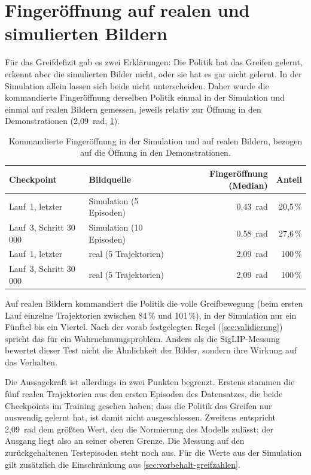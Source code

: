 \section{Fingeröffnung auf realen und simulierten Bildern}
\label{sec:span-gate}

Für das Greifdefizit gab es zwei Erklärungen: Die Politik hat das Greifen
gelernt, erkennt aber die simulierten Bilder nicht, oder sie hat es gar nicht
gelernt. In der Simulation allein lassen sich beide nicht unterscheiden. Daher
wurde die kommandierte Fingeröffnung derselben Politik einmal in der
Simulation und einmal auf realen Bildern gemessen, jeweils relativ zur
Öffnung in den Demonstrationen (2,09~rad, \cref{tab:span-gate}).

\begin{table}[htb]
  \centering
  \begin{tabular}{llrr}
    \toprule
    Checkpoint & Bildquelle & Fingeröffnung (Median) & Anteil \\
    \midrule
    Lauf~1, letzter   & Simulation (5 Episoden)     & 0,43~rad  & 20,5\,\% \\
    Lauf~3, Schritt 30\,000 & Simulation (10 Episoden) & 0,58~rad & 27,6\,\% \\
    Lauf~1, letzter   & real (5 Trajektorien)       & 2,09~rad  & 100\,\% \\
    Lauf~3, Schritt 30\,000 & real (5 Trajektorien) & 2,09~rad  & 100\,\% \\
    \bottomrule
  \end{tabular}
  \caption{Kommandierte Fingeröffnung in der Simulation und auf realen Bildern,
    bezogen auf die Öffnung in den Demonstrationen.}
  \label{tab:span-gate}
\end{table}

Auf realen Bildern kommandiert die Politik die volle Greifbewegung (beim ersten Lauf einzelne
Trajektorien zwischen 84\,\% und 101\,\%), in der Simulation nur ein Fünftel
bis ein Viertel. Nach der vorab festgelegten Regel (\cref{sec:validierung})
spricht das für ein Wahrnehmungsproblem. Anders als die SigLIP-Messung
bewertet dieser Test nicht die Ähnlichkeit der Bilder, sondern ihre Wirkung
auf das Verhalten.

Die Aussagekraft ist allerdings in zwei Punkten begrenzt. Erstens stammen die
fünf realen Trajektorien aus den ersten Episoden des Datensatzes, die beide
Checkpoints im Training gesehen haben; dass die Politik das Greifen nur
auswendig gelernt hat, ist damit nicht ausgeschlossen. Zweitens entspricht
2,09~rad dem größten Wert, den die Normierung des Modells zulässt; der Ausgang
liegt also an seiner oberen Grenze. Die Messung auf den zurückgehaltenen
Testepisoden steht noch aus. Für die Werte aus der Simulation gilt zusätzlich
die Einschränkung aus \cref{sec:vorbehalt-greifzahlen}.

